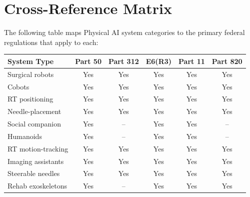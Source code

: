 \documentclass[11pt,letterpaper]{article}
\begin{document}
\section{Cross-Reference Matrix}

The following table maps Physical AI system categories to the primary federal
regulations that apply to each:

\begin{center}
\footnotesize
\begin{tabular}{lccccc}
\toprule
\textbf{System Type} & \textbf{Part 50} & \textbf{Part 312} &
\textbf{E6(R3)} & \textbf{Part 11} & \textbf{Part 820} \\
\midrule
Surgical robots       & Yes & Yes & Yes & Yes & Yes \\
Cobots                & Yes & Yes & Yes & Yes & Yes \\
RT positioning        & Yes & Yes & Yes & Yes & Yes \\
Needle-placement      & Yes & Yes & Yes & Yes & Yes \\
Social companion      & Yes & --  & Yes & Yes & -- \\
Humanoids             & Yes & --  & Yes & Yes & -- \\
RT motion-tracking    & Yes & Yes & Yes & Yes & Yes \\
Imaging assistants    & Yes & Yes & Yes & Yes & Yes \\
Steerable needles     & Yes & Yes & Yes & Yes & Yes \\
Rehab exoskeletons    & Yes & --  & Yes & Yes & Yes \\
\bottomrule
\end{tabular}
\end{center}

\printbibliography[title={References}]
\end{document}
